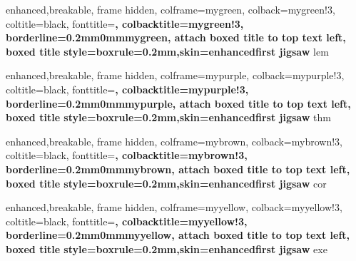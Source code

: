 {
	enhanced,breakable,
	frame hidden,
	colframe=mygreen,
	colback=mygreen!3,
	coltitle=black,
	fonttitle=\bfseries,
	colbacktitle=mygreen!3,
	borderline={0.2mm}{0mm}{mygreen},
	attach boxed title to top text left,
	boxed title style={boxrule=0.2mm,skin=enhancedfirst jigsaw}
}
{lem}

{
	enhanced,breakable,
	frame hidden,
	colframe=mypurple,
	colback=mypurple!3,
	coltitle=black,
	fonttitle=\bfseries,
	colbacktitle=mypurple!3,
	borderline={0.2mm}{0mm}{mypurple},
	attach boxed title to top text left,
	boxed title style={boxrule=0.2mm,skin=enhancedfirst jigsaw}
}
{thm}

{
	enhanced,breakable,
	frame hidden,
	colframe=mybrown,
	colback=mybrown!3,
	coltitle=black,
	fonttitle=\bfseries,
	colbacktitle=mybrown!3,
	borderline={0.2mm}{0mm}{mybrown},
	attach boxed title to top text left,
	boxed title style={boxrule=0.2mm,skin=enhancedfirst jigsaw}
}
{cor}

{
	enhanced,breakable,
	frame hidden,
	colframe=myyellow,
	colback=myyellow!3,
	coltitle=black,
	fonttitle=\bfseries,
	colbacktitle=myyellow!3,
	borderline={0.2mm}{0mm}{myyellow},
	attach boxed title to top text left,
	boxed title style={boxrule=0.2mm,skin=enhancedfirst jigsaw}
}
{exe}

\def\R{\mathbb R}
\def\C{\mathbb C}
\def\N{\mathbb N}
\def\Z{\mathbb Z}
\def\Q{\mathbb Q}

\def\mor{\mathrm {Mor}}
\def\ob{\mathrm {Ob}}